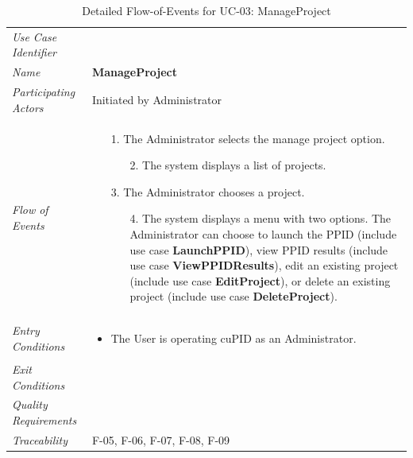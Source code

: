\documentclass[12pt,letterpaper]{article}
\begin{document}
\begin{table}[H]
	\caption{Detailed Flow-of-Events for UC-03: ManageProject}
  	  \begin{tabu} to 
		\toprule
		Use Case Identifier & \manageproject{} \\
		Name & {\bf ManageProject} \\
   	     Participating Actors & Initiated by Administrator \\
		Flow of Events & 
		\begin{minipage}[t]{\linewidth}
		    \begin{enumerate}
			    \item[1.] The Administrator selects the manage project option.
			    \begin{enumerate}
			        \item[2.] The system displays a list of projects.
				\end{enumerate}
				\item[3.] The Administrator chooses a project.
				\begin{enumerate}
				    \item[4.] The system displays a menu with two options. The Administrator can choose to launch the PPID (include use case \textbf{LaunchPPID}), view PPID results (include use case \textbf{ViewPPIDResults}), edit an existing project (include use case \textbf{EditProject}), or delete an existing project (include use case \textbf{DeleteProject}).
				\end{enumerate}
			\end{enumerate}
	    \end{minipage} \\

		Entry Conditions &
		\begin{minipage}[t]{\linewidth}
			\begin{itemize}
			    \item The User is operating cuPID as an Administrator.
	        \end{itemize}
	    \end{minipage} \\

		Exit Conditions & \\

		Quality Requirements & \\

		Traceability & F-05, F-06, F-07, F-08, F-09\\
        \toprule
    \end{tabu}
\end{table}
\end{document}
